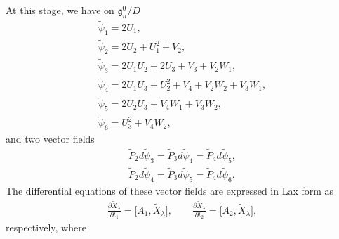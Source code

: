 \documentclass[pdftex]{sigma}
\numberwithin{equation}{section}
\begin{document}
At this stage, we have on $\mathfrak{g}^0_n/D$
\begin{gather*}
\widetilde{\psi}_1 = 2U_1, \\
\widetilde{\psi}_2 = 2U_2+U_1^2+V_2, \\
\widetilde{\psi}_3 = 2U_1U_2 + 2U_3 + V_3 + V_2W_1, \\
\widetilde{\psi}_4 = 2U_1U_3 + U_2^2 + V_4 + V_2W_2+ V_3W_1, \\
\widetilde{\psi}_5 = 2U_2U_3 + V_4W_1 + V_3W_2, \\
\widetilde{\psi}_6 = U_3^2 + V_4W_2,
\end{gather*}
and two vector f\/ields
\begin{gather}
 \widetilde{P}_2d\widetilde{\psi}_3 = \widetilde{P}_3d\widetilde{\psi}_4 = \widetilde{P}_4d\widetilde{\psi}_5,\label{vec1} \\
 \widetilde{P}_2d\widetilde{\psi}_4 = \widetilde{P}_3d\widetilde{\psi}_5 = \widetilde{P}_4d\widetilde{\psi}_6.\label{vec2}
\end{gather}
The dif\/ferential equations of these vector f\/ields are expressed in Lax form as
\begin{gather}
\frac{\partial \widetilde{X}_\lambda }{\partial t_1} = \big[A_1, \widetilde{X}_\lambda \big], \qquad
\frac{\partial \widetilde{X}_\lambda }{\partial t_2} = \big[A_2, \widetilde{X}_\lambda \big],\label{Lax4}
\end{gather}
respectively, where
\end{document}
